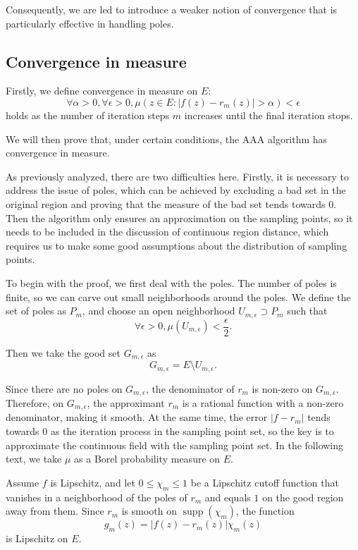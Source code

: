 \documentclass[12pt,a4paper]{article}  %
\theoremstyle{definition}
\numberwithin{equation}{section}
\begin{document}
Consequently, we are led to introduce a weaker notion of convergence that is particularly effective in handling poles.

\subsection{Convergence in measure}
Firstly, we define convergence in measure on $E$: 
\[
\forall\alpha>0,\forall\epsilon>0,\mu(z\in E:|f(z)-r_m(z)|>\alpha)<\epsilon
\]
holds as the number of iteration steps $m$ increases until the final iteration stops. 


We will then prove that, under certain conditions, the AAA algorithm has convergence in measure.

As previously analyzed, there are two difficulties here. Firstly, it is necessary to address the issue of poles, which can be achieved by excluding a bad set in the original region and proving that the measure of the bad set tends towards 0. Then the algorithm only ensures an approximation on the sampling points, so it needs to be included in the discussion of continuous region distance, which requires us to make some good assumptions about the distribution of sampling points.

To begin with the proof, we first deal with the poles. The number of poles is finite, so we can carve out small neighborhoods around the poles. We define the set of poles as $P_m$, and choose an open neighborhood $U_{m,\epsilon}\supset P_m$ such that
\begin{equation}
   \forall\epsilon>0,\mu(U_{m,\epsilon})<\frac{\epsilon}{2}.  \label{eq:bad set}
\end{equation}

Then we take the good set $G_{m,\epsilon}$ as 
\[
G_{m,\epsilon}=E\setminus U_{m,\epsilon}.
\]

Since there are no poles on $G_{m,\epsilon}$, the denominator of $r_m$ is non-zero on $G_{m,\epsilon}$. Therefore, on $G_{m,\epsilon}$, the approximant $r_m$ is a rational function with a non-zero denominator, making it smooth. At the same time, the error $|f-r_m|$ tends towards 0 as the iteration process in the sampling point set, so the key is to approximate the continuous field with the sampling point set. In the following text, we take $\mu$ as a Borel probability measure on $E$.

Assume $f$ is Lipschitz, and let $0\le\chi_m\le1$ be a Lipschitz cutoff function that vanishes in a neighborhood of the poles of $r_m$ and equals $1$ on the good region away from them. Since $r_m$ is smooth on $\operatorname{supp}(\chi_m)$, the function
\[
g_m(z)=|f(z)-r_m(z)|\chi_m(z)
\]
is Lipschitz on $E$.
\end{document}
